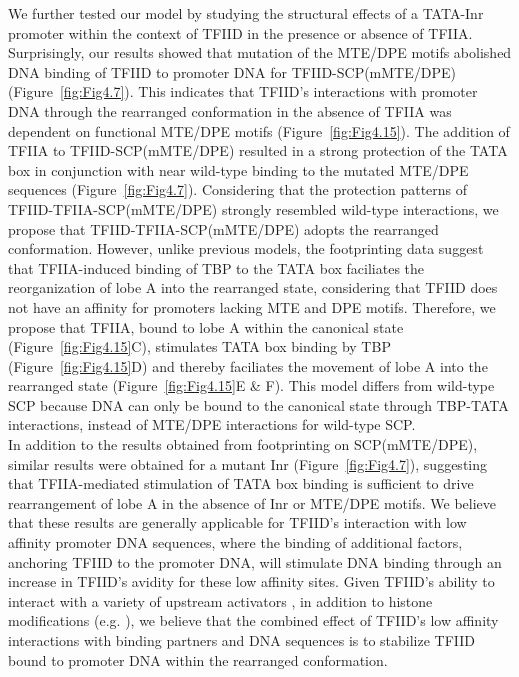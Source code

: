 We further tested our model by studying the structural effects of a TATA-Inr promoter within the context of TFIID in the presence or absence of TFIIA. Surprisingly, our results showed that mutation of the MTE/DPE motifs abolished DNA binding of TFIID to promoter DNA for TFIID-SCP(mMTE/DPE) (Figure~\ref{fig:Fig4.7}). This indicates that TFIID's interactions with promoter DNA through the rearranged conformation in the absence of TFIIA was dependent on functional MTE/DPE motifs (Figure~\ref{fig:Fig4.15}). The addition of TFIIA to TFIID-SCP(mMTE/DPE) resulted in a strong protection of the TATA box in conjunction with near wild-type binding to the mutated MTE/DPE sequences (Figure~\ref{fig:Fig4.7}). Considering that the protection patterns of TFIID-TFIIA-SCP(mMTE/DPE) strongly resembled wild-type interactions, we propose that TFIID-TFIIA-SCP(mMTE/DPE) adopts the rearranged conformation. However, unlike previous models, the footprinting data suggest that TFIIA-induced binding of TBP to the TATA box faciliates the reorganization of lobe A into the rearranged state, considering that TFIID does not have an affinity for promoters lacking MTE and DPE motifs. Therefore, we propose that TFIIA, bound to lobe A within the canonical state (Figure~\ref{fig:Fig4.15}C), stimulates TATA box binding by TBP (Figure~\ref{fig:Fig4.15}D) and thereby faciliates the movement of lobe A into the rearranged state (Figure~\ref{fig:Fig4.15}E \& F). This model differs from wild-type SCP because DNA can only be bound to the canonical state through TBP-TATA interactions, instead of MTE/DPE interactions for wild-type SCP. \\
\indent In addition to the results obtained from footprinting on SCP(mMTE/DPE), similar results were obtained for a mutant Inr (Figure~\ref{fig:Fig4.7}), suggesting that TFIIA-mediated stimulation of TATA box binding is sufficient to drive rearrangement of lobe A in the absence of Inr or MTE/DPE motifs. We believe that these results are generally applicable for TFIID's interaction with low affinity promoter DNA sequences, where the binding of additional factors, anchoring TFIID to the promoter DNA, will stimulate DNA binding through an increase in TFIID's avidity for these low affinity sites. Given TFIID's ability to interact with a variety of upstream activators \cite{Goodrich_503,Levine_1710}, in addition to histone modifications (e.g. \cite{Jacobson_2000,Vermeulen_2007}), we believe that the combined effect of TFIID's low affinity interactions with binding partners and DNA sequences is to stabilize TFIID bound to promoter DNA within the rearranged conformation.\\


